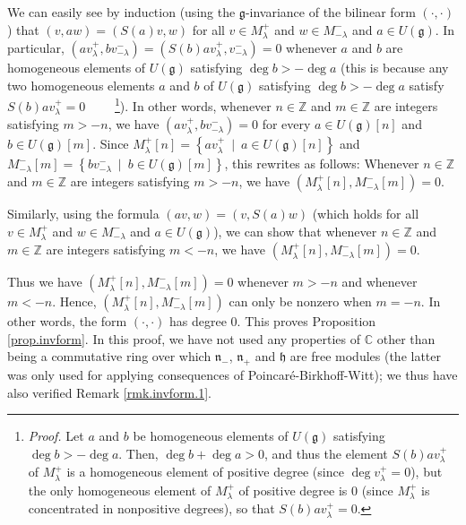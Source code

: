 \documentclass
[numbers=enddot,12pt,final,onecolumn,german,notitlepage]{scrartcl}%
\theoremstyle{definition}
\begin{document}
We can easily see by induction (using the $\mathfrak{g}$-invariance of the
bilinear form $\left(  \cdot,\cdot\right)  $) that $\left(  v,aw\right)
=\left(  S\left(  a\right)  v,w\right)  $ for all $v\in M_{\lambda}^{+}$ and
$w\in M_{-\lambda}^{-}$ and $a\in U\left(  \mathfrak{g}\right)  $. In
particular, $\left(  av_{\lambda}^{+},bv_{-\lambda}^{-}\right)  =\left(
S\left(  b\right)  av_{\lambda}^{+},v_{-\lambda}^{-}\right)  =0$ whenever $a$
and $b$ are homogeneous elements of $U\left(  \mathfrak{g}\right)  $
satisfying $\deg b>-\deg a$ (this is because any two homogeneous elements $a$
and $b$ of $U\left(  \mathfrak{g}\right)  $ satisfying $\deg b>-\deg a$
satisfy $S\left(  b\right)  av_{\lambda}^{+}=0$%
\ \ \ \ \footnote{\textit{Proof.} Let $a$ and $b$ be homogeneous elements of
$U\left(  \mathfrak{g}\right)  $ satisfying $\deg b>-\deg a$. Then, $\deg
b+\deg a>0$, and thus the element $S\left(  b\right)  av_{\lambda}^{+}$ of
$M_{\lambda}^{+}$ is a homogeneous element of positive degree (since $\deg
v_{\lambda}^{+}=0$), but the only homogeneous element of $M_{\lambda}^{+}$ of
positive degree is $0$ (since $M_{\lambda}^{+}$ is concentrated in nonpositive
degrees), so that $S\left(  b\right)  av_{\lambda}^{+}=0$.}). In other words,
whenever $n\in\mathbb{Z}$ and $m\in\mathbb{Z}$ are integers satisfying $m>-n$,
we have $\left(  av_{\lambda}^{+},bv_{-\lambda}^{-}\right)  =0$ for every
$a\in U\left(  \mathfrak{g}\right)  \left[  n\right]  $ and $b\in U\left(
\mathfrak{g}\right)  \left[  m\right]  $. Since $M_{\lambda}^{+}\left[
n\right]  =\left\{  av_{\lambda}^{+}\ \mid\ a\in U\left(  \mathfrak{g}\right)
\left[  n\right]  \right\}  $ and $M_{-\lambda}^{-}\left[  m\right]  =\left\{
bv_{-\lambda}^{-}\ \mid\ b\in U\left(  \mathfrak{g}\right)  \left[  m\right]
\right\}  $, this rewrites as follows: Whenever $n\in\mathbb{Z}$ and
$m\in\mathbb{Z}$ are integers satisfying $m>-n$, we have $\left(  M_{\lambda
}^{+}\left[  n\right]  ,M_{-\lambda}^{-}\left[  m\right]  \right)  =0$.

Similarly, using the formula $\left(  av,w\right)  =\left(  v,S\left(
a\right)  w\right)  $ (which holds for all $v\in M_{\lambda}^{+}$ and $w\in
M_{-\lambda}^{-}$ and $a\in U\left(  \mathfrak{g}\right)  $), we can show that
whenever $n\in\mathbb{Z}$ and $m\in\mathbb{Z}$ are integers satisfying $m<-n$,
we have $\left(  M_{\lambda}^{+}\left[  n\right]  ,M_{-\lambda}^{-}\left[
m\right]  \right)  =0$.

Thus we have $\left(  M_{\lambda}^{+}\left[  n\right]  ,M_{-\lambda}%
^{-}\left[  m\right]  \right)  =0$ whenever $m>-n$ and whenever $m<-n$. Hence,
$\left(  M_{\lambda}^{+}\left[  n\right]  ,M_{-\lambda}^{-}\left[  m\right]
\right)  $ can only be nonzero when $m=-n$. In other words, the form $\left(
\cdot,\cdot\right)  $ has degree $0$. This proves Proposition
\ref{prop.invform}. In this proof, we have not used any properties of
$\mathbb{C}$ other than being a commutative ring over which $\mathfrak{n}_{-}%
$, $\mathfrak{n}_{+}$ and $\mathfrak{h}$ are free modules (the latter was only
used for applying consequences of Poincar\'{e}-Birkhoff-Witt); we thus have
also verified Remark \ref{rmk.invform.1}.
\end{document}
